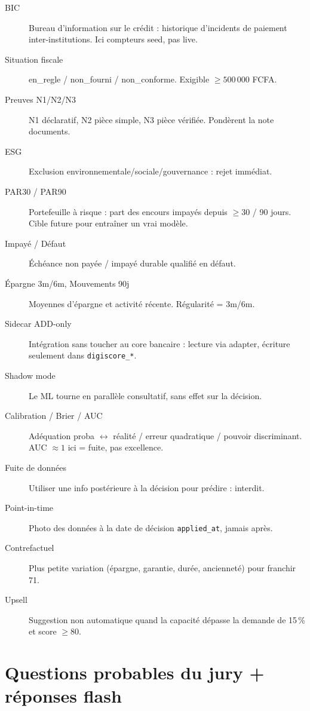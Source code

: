 \documentclass[11pt,a4paper]{article}
\newcommand{\C}[1]{{\small\texttt{\nolinkurl{#1}}}}
\begin{document}
\begin{description}
  \item[BIC] Bureau d'information sur le crédit : historique d'incidents de paiement inter-institutions. Ici compteurs seed, pas live.
  \item[Situation fiscale] en\_regle / non\_fourni / non\_conforme. Exigible $\geq 500\,000$ FCFA.
  \item[Preuves N1/N2/N3] N1 déclaratif, N2 pièce simple, N3 pièce vérifiée. Pondèrent la note documents.
  \item[ESG] Exclusion environnementale/sociale/gouvernance : rejet immédiat.
  \item[PAR30 / PAR90] Portefeuille à risque : part des encours impayés depuis $\geq 30$ / 90 jours. Cible future pour entraîner un vrai modèle.
  \item[Impayé / Défaut] Échéance non payée / impayé durable qualifié en défaut.
  \item[Épargne 3m/6m, Mouvements 90j] Moyennes d'épargne et activité récente. Régularité = 3m/6m.
  \item[Sidecar ADD-only] Intégration sans toucher au core bancaire : lecture via adapter, écriture seulement dans \texttt{digiscore\_*}.
  \item[Shadow mode] Le ML tourne en parallèle consultatif, sans effet sur la décision.
  \item[Calibration / Brier / AUC] Adéquation proba $\leftrightarrow$ réalité / erreur quadratique / pouvoir discriminant. AUC $\approx 1$ ici = fuite, pas excellence.
  \item[Fuite de données] Utiliser une info postérieure à la décision pour prédire : interdit.
  \item[Point-in-time] Photo des données à la date de décision \C{applied_at}, jamais après.
  \item[Contrefactuel] Plus petite variation (épargne, garantie, durée, ancienneté) pour franchir 71.
  \item[Upsell] Suggestion non automatique quand la capacité dépasse la demande de 15\,\% et score $\geq 80$.
\end{description}

\section{Questions probables du jury + réponses flash}
\end{document}
